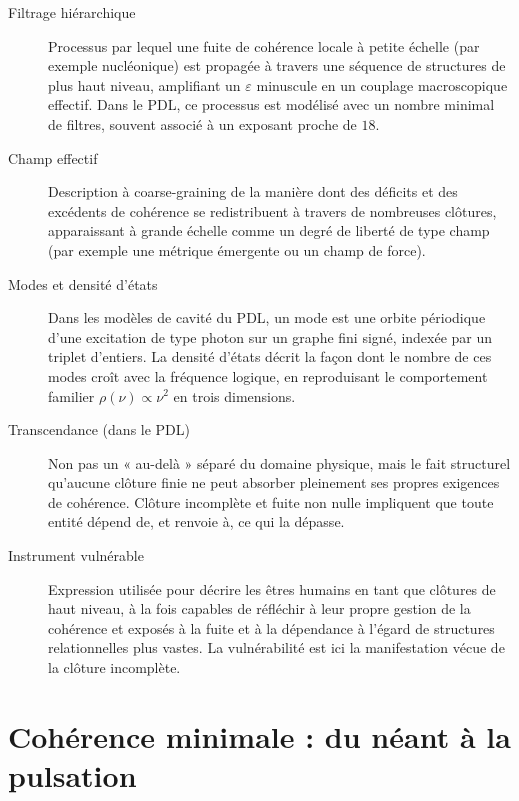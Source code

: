 \documentclass[11pt,a4paper]{article}
\theoremstyle{definition}
\begin{document}
\begin{description}
\item[Filtrage hiérarchique]
Processus par lequel une fuite de cohérence locale à petite échelle (par exemple nucléonique) est propagée à travers une séquence de structures de plus haut niveau, amplifiant un \(\varepsilon\) minuscule en un couplage macroscopique effectif. Dans le PDL, ce processus est modélisé avec un nombre minimal de filtres, souvent associé à un exposant proche de \(18\).\cite{Laubscher_Exponent18_v2_2024,Laubscher_UniversalCoherenceLeakage_2024}

\item[Champ effectif]
Description à coarse-graining de la manière dont des déficits et des excédents de cohérence se redistribuent à travers de nombreuses clôtures, apparaissant à grande échelle comme un degré de liberté de type champ (par exemple une métrique émergente ou un champ de force).\cite{Laubscher_EffectiveFields_2024}

\item[Modes et densité d’états]
Dans les modèles de cavité du PDL, un mode est une orbite périodique d’une excitation de type photon sur un graphe fini signé, indexée par un triplet d’entiers. La densité d’états décrit la façon dont le nombre de ces modes croît avec la fréquence logique, en reproduisant le comportement familier \(\rho(\nu)\propto\nu^2\) en trois dimensions.\cite{Laubscher_CavityModes_PDL_2024}

\item[Transcendance (dans le PDL)]
Non pas un « au-delà » séparé du domaine physique, mais le fait structurel qu’aucune clôture finie ne peut absorber pleinement ses propres exigences de cohérence. Clôture incomplète et fuite non nulle impliquent que toute entité dépend de, et renvoie à, ce qui la dépasse.\cite{Laubscher_Existence_PulsatingClosure_2026,Laubscher_PDL_TO_Dialogue_2024}

\item[Instrument vulnérable]
Expression utilisée pour décrire les êtres humains en tant que clôtures de haut niveau, à la fois capables de réfléchir à leur propre gestion de la cohérence et exposés à la fuite et à la dépendance à l’égard de structures relationnelles plus vastes. La vulnérabilité est ici la manifestation vécue de la clôture incomplète.\cite{Laubscher_Existence_PulsatingClosure_2026}

\end{description}

\section{Cohérence minimale : du néant à la pulsation}
\label{sec:minimal_coherence}
\end{document}
